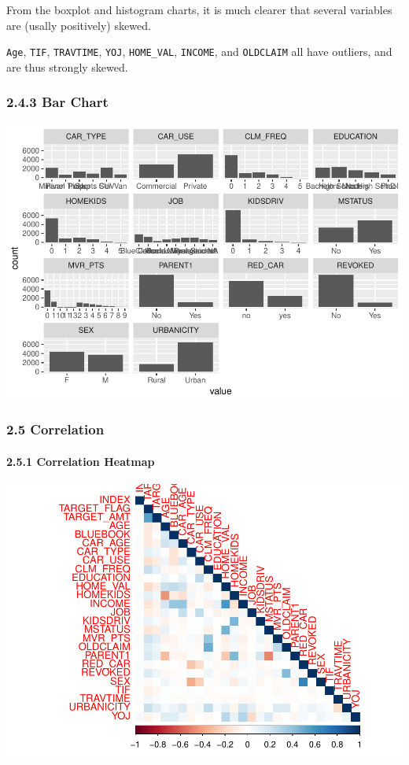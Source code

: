 \documentclass[]{article}
\let\oldparagraph\paragraph
\renewcommand{\paragraph}[1]{\oldparagraph{#1}\mbox{}}
\begin{document}
From the boxplot and histogram charts, it is much clearer that several
variables are (usally positively) skewed.

\texttt{Age}, \texttt{TIF}, \texttt{TRAVTIME}, \texttt{YOJ},
\texttt{HOME\_VAL}, \texttt{INCOME}, and \texttt{OLDCLAIM} all have
outliers, and are thus strongly skewed.

\subsubsection{2.4.3 Bar Chart}\label{bar-chart}

\includegraphics{DATA_621_Homework_4_files/figure-latex/summary-bar-1.pdf}

\subsubsection{2.5 Correlation}\label{correlation}

\paragraph{2.5.1 Correlation Heatmap}\label{correlation-heatmap}

\includegraphics{DATA_621_Homework_4_files/figure-latex/summary-correlation-heatmap-1.pdf}
\end{document}
